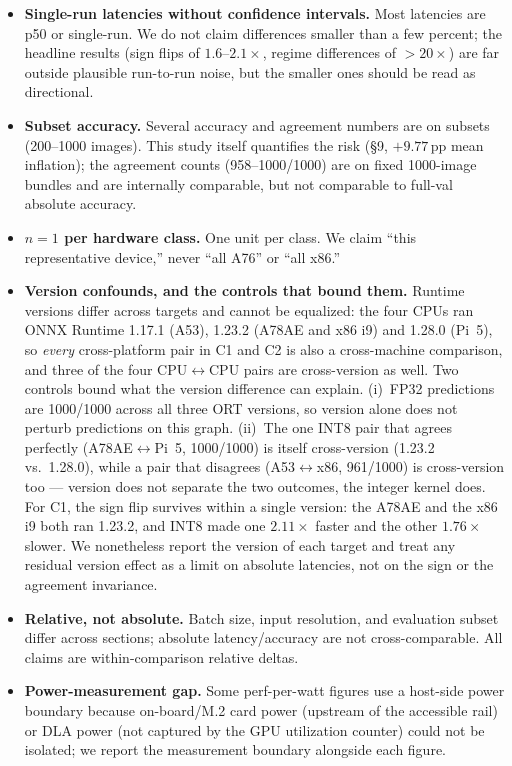 \documentclass[11pt]{article}
\begin{document}
\begin{itemize}
\item \textbf{Single-run latencies without confidence intervals.} Most latencies are p50 or single-run. We do not claim differences smaller than a few percent; the headline results (sign flips of $1.6$--$2.1\times$, regime differences of ${>}20\times$) are far outside plausible run-to-run noise, but the smaller ones should be read as directional.
\item \textbf{Subset accuracy.} Several accuracy and agreement numbers are on subsets (200--1000 images). This study itself quantifies the risk (\S9, $+9.77$\,pp mean inflation); the agreement counts (958--1000/1000) are on fixed 1000-image bundles and are internally comparable, but not comparable to full-val absolute accuracy.
\item \textbf{$n=1$ per hardware class.} One unit per class. We claim ``this representative device,'' never ``all A76'' or ``all x86.''
\item \textbf{Version confounds, and the controls that bound them.} Runtime versions differ across targets and cannot be equalized: the four CPUs ran ONNX Runtime 1.17.1 (A53), 1.23.2 (A78AE and x86 i9) and 1.28.0 (Pi~5), so \emph{every} cross-platform pair in C1 and C2 is also a cross-machine comparison, and three of the four CPU$\leftrightarrow$CPU pairs are cross-version as well. Two controls bound what the version difference can explain. (i)~FP32 predictions are 1000/1000 across all three ORT versions, so version alone does not perturb predictions on this graph. (ii)~The one INT8 pair that agrees perfectly (A78AE$\leftrightarrow$Pi~5, 1000/1000) is itself cross-version (1.23.2 vs.\ 1.28.0), while a pair that disagrees (A53$\leftrightarrow$x86, 961/1000) is cross-version too --- version does not separate the two outcomes, the integer kernel does. For C1, the sign flip survives within a single version: the A78AE and the x86 i9 both ran 1.23.2, and INT8 made one $2.11\times$ faster and the other $1.76\times$ slower. We nonetheless report the version of each target and treat any residual version effect as a limit on absolute latencies, not on the sign or the agreement invariance.
\item \textbf{Relative, not absolute.} Batch size, input resolution, and evaluation subset differ across sections; absolute latency/accuracy are not cross-comparable. All claims are within-comparison relative deltas.
\item \textbf{Power-measurement gap.} Some perf-per-watt figures use a host-side power boundary because on-board/M.2 card power (upstream of the accessible rail) or DLA power (not captured by the GPU utilization counter) could not be isolated; we report the measurement boundary alongside each figure.

\end{itemize}
\end{document}
